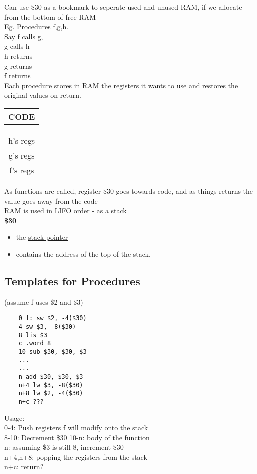 \documentclass[12pt]{article}
\newcommand{\myt}[1]{\textbf{\underline{#1}}}
\begin{document}
	Can use \$30 as a bookmark to seperate used and unused RAM, if we allocate from the bottom of free RAM\\
	
	Eg. Procedures f,g,h.\\
	Say f calls g,\\
	g calls h\\
	h returns\\
	g returns\\
	f returns\\
	
	Each procedure stores in RAM the registers it wants to use and restores the original values on return.\\
	
	\begin{tabular}{| c |}
		\hline
		CODE \\ \hline
		\\ 
		\\
		\\ \hline
		h's regs \\ \hline
		g's regs \\ \hline
		f's regs \\ \hline
	\end{tabular}
	
	As functions are called, register \$30 goes towards code, and as things returns the value goes away from the code\\
	
	RAM is used in LIFO order - as a stack\\
	\myt{\$30}
	\begin{itemize}
		\item the \underline{stack pointer}
		\item contains the address of the top of the stack.
	\end{itemize}
	
	\subsection*{Templates for Procedures}
	(assume f uses \$2 and \$3)
	\lstset{language=[mips]Assembler}
	\begin{lstlisting}
	0 f: sw $2, -4($30)
	4 sw $3, -8($30)
	8 lis $3
	c .word 8
	10 sub $30, $30, $3
	...
	...
	n add $30, $30, $3
	n+4 lw $3, -8($30)
	n+8 lw $2, -4($30)
	n+c ???
	\end{lstlisting}
	Usage:\\
	0-4: Push registers f will modify onto the stack\\
	8-10: Decrement \$30
	10-n: body of the function\\
	n: assuming \$3 is still 8, increment \$30\\
	n+4,n+8: popping the registers from the stack\\
	n+c: return?
	
\end{document}
